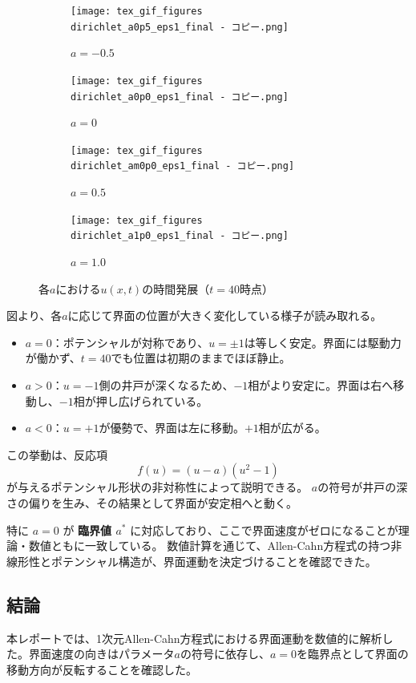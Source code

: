 \documentclass[a4paper,11pt]{article}
\begin{document}
\begin{figure}[H]
  \centering
  \begin{subfigure}[b]{0.45\textwidth}
    \centering
    \texttt{[image: tex\_gif\_figures\\dirichlet\_a0p5\_eps1\_final - コピー.png]}
    \caption{$a = -0.5$}
  \end{subfigure}
  \hfill
  \begin{subfigure}[b]{0.45\textwidth}
    \centering
    \texttt{[image: tex\_gif\_figures\\dirichlet\_a0p0\_eps1\_final - コピー.png]}
    \caption{$a = 0$}
  \end{subfigure}

  \vspace{0.5cm}
  \begin{subfigure}[b]{0.45\textwidth}
    \centering
    \texttt{[image: tex\_gif\_figures\\dirichlet\_am0p0\_eps1\_final - コピー.png]}
    \caption{$a = 0.5$}
  \end{subfigure}
  \hfill
  \begin{subfigure}[b]{0.45\textwidth}
    \centering
    \texttt{[image: tex\_gif\_figures\\dirichlet\_a1p0\_eps1\_final - コピー.png]}
    \caption{$a = 1.0$}
  \end{subfigure}
  \caption{各$a$における$u(x,t)$の時間発展（$t = 40$時点）}
  \label{fig:gif_evolution}
\end{figure}

図より、各$a$に応じて界面の位置が大きく変化している様子が読み取れる。

\begin{itemize}
  \item $a = 0$：ポテンシャルが対称であり、$u = \pm1$は等しく安定。界面には駆動力が働かず、$t = 40$でも位置は初期のままでほぼ静止。
  \item $a > 0$：$u = -1$側の井戸が深くなるため、$-1$相がより安定に。界面は右へ移動し、$-1$相が押し広げられている。
  \item $a < 0$：$u = +1$が優勢で、界面は左に移動。$+1$相が広がる。
\end{itemize}

この挙動は、反応項
\[
f(u) = (u - a)(u^2 - 1)
\]
が与えるポテンシャル形状の非対称性によって説明できる。  
$a$の符号が井戸の深さの偏りを生み、その結果として界面が安定相へと動く。

特に $a = 0$ が \textbf{臨界値 $a^*$} に対応しており、ここで界面速度がゼロになることが理論・数値ともに一致している。
数値計算を通じて、Allen-Cahn方程式の持つ非線形性とポテンシャル構造が、界面運動を決定づけることを確認できた。
\subsection{結論}
本レポートでは、1次元Allen-Cahn方程式における界面運動を数値的に解析した。界面速度の向きはパラメータ$a$の符号に依存し、$a = 0$を臨界点として界面の移動方向が反転することを確認した。
\end{document}
